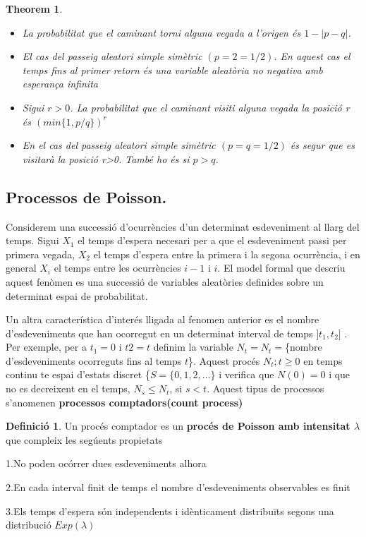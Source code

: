 \documentclass[
  catalan,
]{article}
\newtheorem{theorem}{Theorem}[section]
\theoremstyle{definition}
\newtheorem{definition}{Definició}[section]
\theoremstyle{definition}
\theoremstyle{definition}
\theoremstyle{definition}
\theoremstyle{remark}
\begin{document}
\begin{theorem}
\leavevmode

\begin{itemize}
\item
  La probabilitat que el caminant torni alguna vegada a l'origen és \(1-|p-q|\).
\item
  El cas del passeig aleatori simple simètric \((p=2=1/2)\). En aquest cas el temps fins al primer retorn és una variable aleatòria no negativa amb esperança infinita
\item
  Sigui \(r>0\). La probabilitat que el caminant visiti alguna vegada la posició r és \((min\{ 1,p/q\})^r\)
\item
  En el cas del passeig aleatori simple simètric \((p=q=1/2)\) és segur que es visitarà la posició r\textgreater0. També ho és si \(p>q\).
\end{itemize}

\end{theorem}

\subsection{Processos de Poisson.}\label{processos-de-poisson.}

Considerem una successió d'ocurrències d'un determinat esdeveniment al llarg del temps. Sigui \(X_1\) el temps d'espera necesari per a que el esdeveniment passi per primera vegada, \(X_2\) el temps d'espera entre la primera i la segona ocurrència, i en general \(X_i\) el temps entre les ocurrències \(i-1\) i \(i\). El model formal que descriu aquest fenòmen es una successió de variables aleatòries definides sobre un determinat espai de probabilitat.

Un altra característica d'interés lligada al fenomen anterior es el nombre d'esdeveniments que han ocorregut en un determinat interval de temps \(]t_1,t_2]\) . Per exemple, per a \(t_1=0\) i \(t2=t\) definim la variable \(N_t=N_t=\)\{nombre d'esdeveniments ocorreguts fins al temps \(t\)\}. Aquest procés \(N_t; t\geq0\) en temps continu te espai d'estats discret \{\(S=\{0,1,2,\dots \}\) i verifica que \(N(0)=0\) i que no es decreixent en el temps, \(N_s\leq N_t\), si \(s<t\). Aquest tipus de processos s'anomenen \textbf{processos comptadors(count process)}

\begin{definition}
Un procés comptador es un \textbf{procés de Poisson amb intensitat \(\lambda\)} que compleix les segúents propietats

1.No poden ocórrer dues esdeveniments alhora

2.En cada interval finit de temps el nombre d'esdeveniments observables es finit

3.Els temps d'espera són independents i idènticament distribuïts segons una distribució \(Exp(\lambda)\)
\end{definition}
\end{document}
